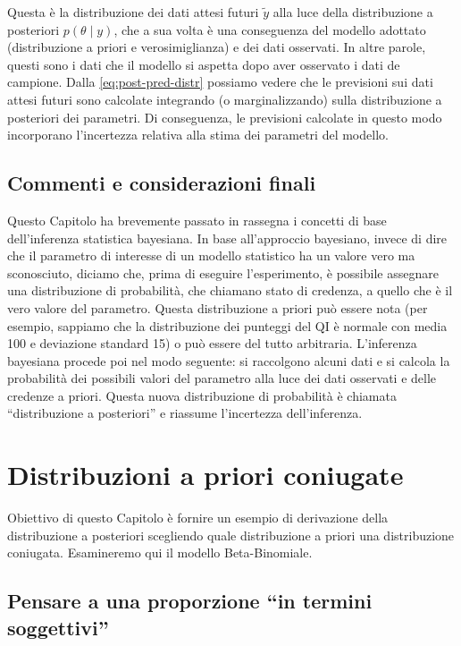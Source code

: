\documentclass[
  11pt,
]{krantz}
\theoremstyle{definition}
\theoremstyle{definition}
\theoremstyle{definition}
\theoremstyle{definition}
\theoremstyle{remark}
\begin{document}
Questa è la distribuzione dei dati attesi futuri \(\tilde{y}\) alla luce della distribuzione a posteriori \(p(\theta \mid y)\), che a sua volta è una conseguenza del modello adottato (distribuzione a priori e verosimiglianza) e dei dati osservati. In altre parole, questi sono i dati che il modello si aspetta dopo aver osservato i dati de campione. Dalla \eqref{eq:post-pred-distr} possiamo vedere che le previsioni sui dati attesi futuri sono calcolate integrando (o marginalizzando) sulla distribuzione a posteriori dei parametri. Di conseguenza, le previsioni calcolate in questo modo incorporano l'incertezza relativa alla stima dei parametri del modello.

\hypertarget{commenti-e-considerazioni-finali}{%
\section*{Commenti e considerazioni finali}\label{commenti-e-considerazioni-finali}}


Questo Capitolo ha brevemente passato in rassegna i concetti di base dell'inferenza statistica bayesiana. In base all'approccio bayesiano, invece di dire che il parametro di interesse di un modello statistico ha un valore vero ma sconosciuto, diciamo che, prima di eseguire l'esperimento, è possibile assegnare una distribuzione di probabilità, che chiamano stato di credenza, a quello che è il vero valore del parametro. Questa distribuzione a priori può essere nota (per esempio, sappiamo che la distribuzione dei punteggi del QI è normale con media 100 e deviazione standard 15) o può essere del tutto arbitraria. L'inferenza bayesiana procede poi nel modo seguente: si raccolgono alcuni dati e si calcola la probabilità dei possibili valori del parametro alla luce dei dati osservati e delle credenze a priori. Questa nuova distribuzione di probabilità è chiamata ``distribuzione a posteriori'' e riassume l'incertezza dell'inferenza.

\hypertarget{chapter-distr-coniugate}{%
\chapter{Distribuzioni a priori coniugate}\label{chapter-distr-coniugate}}

Obiettivo di questo Capitolo è fornire un esempio di derivazione della distribuzione a posteriori scegliendo quale distribuzione a priori una distribuzione coniugata. Esamineremo qui il modello Beta-Binomiale.

\hypertarget{pensare-a-una-proporzione-in-termini-soggettivi}{%
\section{Pensare a una proporzione ``in termini soggettivi''}\label{pensare-a-una-proporzione-in-termini-soggettivi}}
\end{document}
